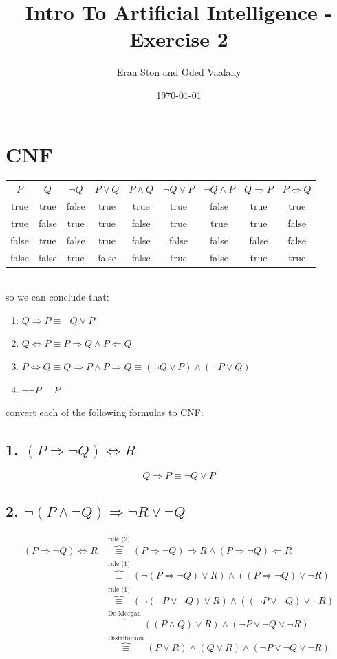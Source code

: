 \documentclass{article}
\title{Intro To Artificial Intelligence - Exercise 2}
\author{Eran Ston and Oded Vaalany}
\date{\today}
\begin{document}
\maketitle

\section{CNF}
\begin{tabular}{ccccccccc}
    $P$ & $Q$  & $\neg Q$ & $P \lor Q$ & $P \land Q$ & $\neg Q \lor P$ & $\neg Q \land P$ & $Q \Rightarrow P$ & $P \iff Q$\\
    true&true&false&true&true&true&false&true&true\\
    true&false&true&true&false&true&true&true&false\\
    false&true&false&true&false&false&false&false&false\\
    false&false&true&false&false&true&false&true&true\\
\end{tabular}\\
so we can conclude that:
\begin{enumerate}
    \item $Q \Rightarrow P \equiv \neg Q \lor P$
    \item $Q \iff P \equiv P \Rightarrow Q \land P \Leftarrow Q $
    \item $P \iff Q \equiv Q \Rightarrow P \land P \Rightarrow Q  \equiv (\neg Q \lor P) \land (\neg P \lor Q)$
    \item $\neg \neg P \equiv P$
\end{enumerate}
convert each of the following formulas to CNF:
\subsection{1. $(P \Rightarrow \neg Q) \iff R$}
\begin{equation}
    Q \Rightarrow P \equiv \neg Q \lor P
\end{equation}
\subsection{2. $\neg (P \land \neg Q) \Rightarrow \neg R \lor \neg Q$}
\begin{equation}
    \begin{aligned}
        (P \Rightarrow \neg Q) \iff R &\overbrace{\equiv}^{\text{rule (2)}} (P \Rightarrow \neg Q) \Rightarrow R \land (P \Rightarrow \neg Q) \Leftarrow R\\
        &\overbrace{\equiv}^{\text{rule (1)}} (\neg (P \Rightarrow \neg Q) \lor R ) \land (( P \Rightarrow \neg Q) \lor \neg R)\\
        &\overbrace{\equiv}^{\text{rule (1)}} (\neg (\neg P \lor \neg Q) \lor R ) \land ((\neg P \lor \neg Q) \lor \neg R)\\
        &\overbrace{\equiv}^{\text{De Morgan}} ((  P \land  Q) \lor R) \land (\neg P \lor \neg Q \lor \neg R)\\
        &\overbrace{\equiv}^{\text{Distribution}} ( P \lor R) \land (  Q \lor R) \land  (\neg P \lor \neg Q \lor \neg R)
    \end{aligned}
\end{equation}
\end{document}
